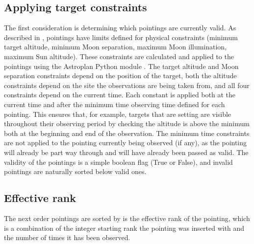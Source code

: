 \begin{colsection}
\begin{colsection}
\end{colsection}

\subsection{Applying target constraints}
\label{sec:constraints}
\begin{colsection}

The first consideration is determining which pointings are currently valid. As described in , pointings have limits defined for physical constraints (minimum target altitude, minimum Moon separation, maximum Moon illumination, maximum Sun altitude). These constraints are calculated and applied to the pointings using the Astroplan Python module \citep[,][]{astroplan}. The target altitude and Moon separation constraints depend on the position of the target, both the altitude constraints depend on the site the observations are being taken from, and all four constraints depend on the current time. Each constant is applied both at the current time and after the minimum time observing time defined for each pointing. This ensures that, for example, targets that are setting are visible throughout their observing period by checking the altitude is above the minimum both at the beginning and end of the observation. The minimum time constraints are not applied to the pointing currently being observed (if any), as the pointing will already be part way through and will have already been passed as valid. The validity of the pointings is a simple boolean flag (True or False), and invalid pointings are naturally sorted below valid ones.

\end{colsection}

\subsection{Effective rank}
\label{sec:rank}
\begin{colsection}

The next order pointings are sorted by is the effective rank of the pointing, which is a combination of the integer starting rank the pointing was inserted with and the number of times it has been observed.


\end{colsection}
\end{colsection}
